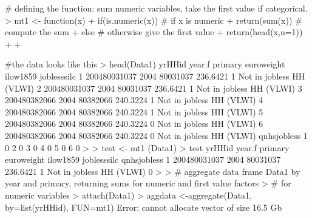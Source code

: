# defining the function: sum numeric variables, take the first value if categorical.
> mt1 <- function(x) {
+   if(is.numeric(x)) { # if x is numeric
+     return(sum(x)) # compute the sum
+   } else { # otherwise give the first value
+     return(head(x,n=1))
+   }
+ }

#the data looks like this
> head(Data1)
        yrHHid year.f  primary euroweight ilow1859              joblesssilc
1 200480031037   2004 80031037   236.6421        1 Not in jobless HH (VLWI)
2 200480031037   2004 80031037   236.6421        1 Not in jobless HH (VLWI)
3 200480382066   2004 80382066   240.3224        1 Not in jobless HH (VLWI)
4 200480382066   2004 80382066   240.3224        1 Not in jobless HH (VLWI)
5 200480382066   2004 80382066   240.3224        0 Not in jobless HH (VLWI)
6 200480382066   2004 80382066   240.3224        0 Not in jobless HH (VLWI)
  qnhsjobless
1           0
2           0
3           0
4           0
5           0
6           0
> 
> test <- mt1 (Data1) 
> test
        yrHHid year.f  primary euroweight ilow1859              joblesssilc qnhsjobless
1 200480031037   2004 80031037   236.6421        1 Not in jobless HH (VLWI)           0
> 
> # aggregate data frame Data1 by year and primary, returning sums for numeric and first value factors
> # for numeric variables
> attach(Data1)
> aggdata <-aggregate(Data1, by=list(yrHHid),  FUN=mt1)
Error: cannot allocate vector of size 16.5 Gb

